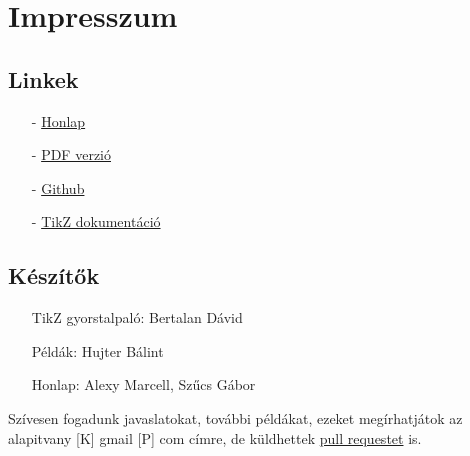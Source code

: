 \chapter{Impresszum}

\section{Linkek}
\begin{enumerate}
    \item[-] \href{./index.html}{Honlap}
    \item[-] \href{./mainpage.pdf}{PDF verzió}
    \item[-] \href{https://github.com/a-gondolkodas-orome/tikz-tutorial}{Github} 
    \item[-] \href{https://ctan.ijs.si/tex-archive/graphics/pgf/base/doc/pgfmanual.pdf}{TikZ dokumentáció} 
\end{enumerate}
        
\section{Készítők}
\begin{enumerate}
    \item[] TikZ gyorstalpaló: Bertalan Dávid
    \item[] Példák: Hujter Bálint
    \item[] Honlap: Alexy Marcell, Szűcs Gábor
\end{enumerate}

Szívesen fogadunk javaslatokat, további példákat, ezeket megírhatjátok az alapitvany [K] gmail [P] com címre, de küldhettek \href{https://github.com/a-gondolkodas-orome/tikz-tutorial/pulls}{pull requestet} is. 

